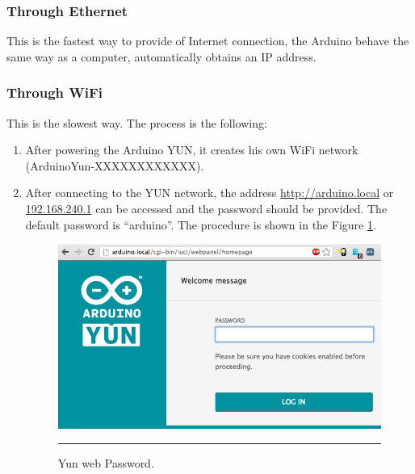 \documentclass[12pt, a4paper,twoside]{tesi_upf}
\begin{document}
    \subsubsection{Through Ethernet}
      This is the fastest way to provide of Internet connection, the Arduino behave the same way as a computer, automatically obtains an IP address.
      
    \subsubsection{Through WiFi}
      This is the slowest way. The process is the following:
      \begin{enumerate}
        \item After powering the Arduino YUN, it creates his own WiFi network (ArduinoYun-XXXXXXXXXXXX).
        \item After connecting to the YUN network, the address \url{http://arduino.local} or \url{192.168.240.1} can be accessed and the password should be provided. The default password is ``arduino''. The procedure is shown in the Figure \ref{fig:YunWebPassword}.
          \begin{figure}[htbp]
            \centering
                \includegraphics[scale=0.3]{./Figures/YunWebPassword.png}
                \rule{18em}{0.5pt}
            \caption[Yun web Password]{Yun web Password.}
            \label{fig:YunWebPassword}
          \end{figure}
        

\end{enumerate}
\end{document}
